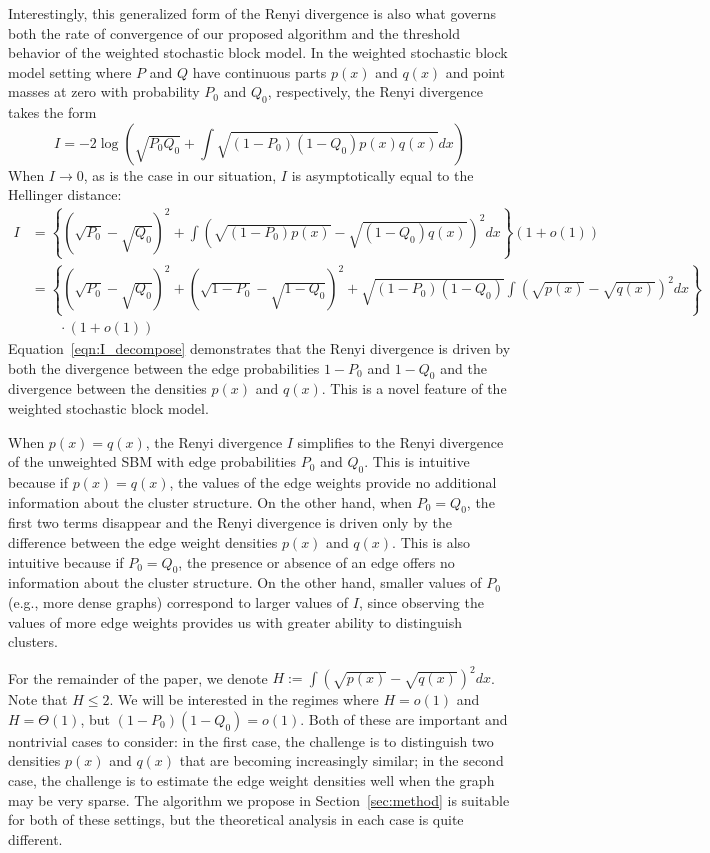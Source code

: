 \documentclass{article}
\begin{document}
Interestingly, this generalized form of the Renyi divergence is also what governs both the rate of convergence of our proposed algorithm and the threshold behavior of the weighted stochastic block model. In the weighted stochastic block model setting where $P$ and $Q$ have continuous parts $p(x)$ and $q(x)$ and point masses at zero with probability $P_0$ and $Q_0$, respectively, the Renyi divergence takes the form
\[
I = -2 \log \left( \sqrt{P_0 Q_0} + \int \sqrt{(1-P_0)(1-Q_0)p(x) q(x)} dx \right)
\]
When $I \rightarrow 0$, as is the case in our situation, $I$ is asymptotically equal to the Hellinger distance:
\begin{align}
I &= \left\{ (\sqrt{P_0} - \sqrt{Q_0})^2 + \int (\sqrt{(1-P_0)p(x)} - \sqrt{(1-Q_0)q(x)} )^2 dx \right\} (1 + o(1)) \nonumber \\ 
 &= \left\{ (\sqrt{P_0} - \sqrt{Q_0})^2 + (\sqrt{1-P_0} - \sqrt{1-Q_0})^2 + 
             \sqrt{(1-P_0)(1-Q_0)} \int (\sqrt{p(x)} - \sqrt{q(x)} )^2 dx \right\} \nonumber \\
             & \qquad \cdot (1 + o(1)) \label{eqn:I_decompose} 
\end{align}
Equation~\eqref{eqn:I_decompose} demonstrates that the Renyi divergence is driven by both the divergence between the edge probabilities $1-P_0$ and $1-Q_0$ and the divergence between the densities $p(x)$ and $q(x)$. This is a novel feature of the weighted stochastic block model. 

When $p(x) = q(x)$, the Renyi divergence $I$ simplifies to the Renyi divergence of the unweighted SBM with edge probabilities $P_0$ and $Q_0$. This is intuitive because if $p(x) = q(x)$, the values of the edge weights provide no additional information about the cluster structure. On the other hand, when $P_0 = Q_0$, the first two terms disappear and the Renyi divergence is driven only by the difference between the edge weight densities $p(x)$ and $q(x)$. This is also intuitive because if $P_0 = Q_0$, the presence or absence of an edge offers no information about the cluster structure. On the other hand, smaller values of $P_0$ (e.g., more dense graphs) correspond to larger values of $I$, since observing the values of more edge weights provides us with greater ability to distinguish clusters.

For the remainder of the paper, we denote $H := \int (\sqrt{p(x)} - \sqrt{q(x)})^2 dx$. Note that $H \leq 2$. We will be interested in the regimes where $H = o(1)$ and $H = \Theta(1)$, but $(1-P_0)(1-Q_0) = o(1)$. Both of these are important and nontrivial cases to consider: in the first case, the challenge is to distinguish two densities $p(x)$ and $q(x)$ that are becoming increasingly similar; in the second case, the challenge is to estimate the edge weight densities well when the graph may be very sparse. The algorithm we propose in Section~\ref{sec:method} is suitable for both of these settings, but the theoretical analysis in each case is quite different.
\end{document}
